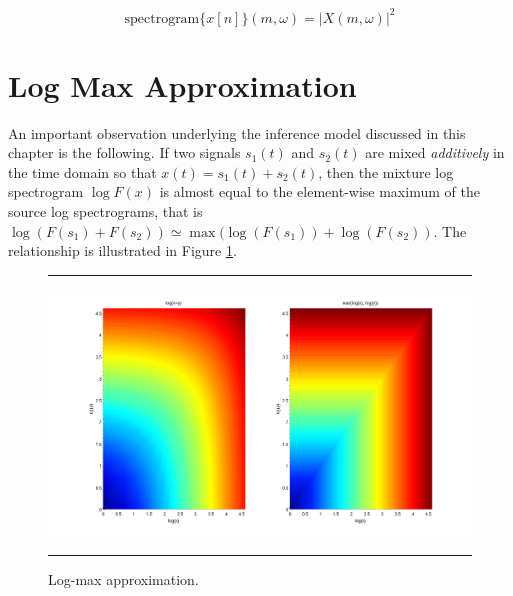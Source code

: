 \documentclass[11pt, oneside, a4paper]{report}
\begin{document}
\begin{equation}\label{spectrogram}
  \text{spectrogram}\{x[n]\}(m,\omega) = |X(m,\omega)|^2 
\end{equation}




\section{Log Max Approximation}

An important observation underlying the inference model discussed in this chapter is the following.
If two signals $s_1(t)$ and $s_2(t)$ are mixed \emph{additively} in the time domain so that 
$x(t) = s_1(t) + s_2(t)$, then the mixture log spectrogram $\log F(x)$ is almost equal to the 
element-wise maximum of the source log spectrograms, that is 
$\log (F(s_1) + F(s_2)) \simeq \max(\log (F(s_1)) + \log (F(s_2))$. The relationship is illustrated in Figure
\ref{logmax_fig}.

\begin{figure}[h!]
  \centering
  \hrule
  \includegraphics[width = .9\textwidth]{Figures/logmax}
  \hrule
  \label{logmax_fig}
  \caption{Log-max approximation.}
\end{figure}
\end{document}
